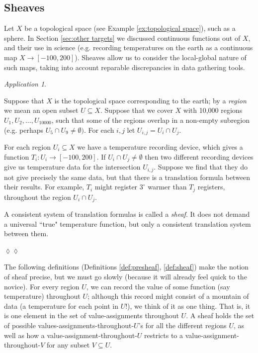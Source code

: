 \documentclass{book}
\def\to{\rightarrow}
\def\taking{\colon}
\def\ss{\subseteq}
\theoremstyle{remark}
\newtheorem{app}[subsubsection]{Application}
\newenvironment{application}{\begin{app}}{\hspace*{\fill}$\lozenge\lozenge$\end{app}}
\theoremstyle{definition}
\begin{document}

\subsection{Sheaves}\label{sec:sheaves}

Let $X$ be a topological space (see Example \ref{ex:topological space}), such as a sphere. In Section \ref{sec:other targets} we discussed continuous functions out of $X$, and their use in science (e.g. recording temperatures on the earth as a continuous map $X\to[-100,200]$). Sheaves allow us to consider the local-global nature of such maps, taking into account reparable discrepancies in data gathering tools. 

\begin{application}\label{app:sheaves of temperature}

Suppose that $X$ is the topological space corresponding to the earth; by a {\em region} we mean an open subset $U\ss X$. Suppose that we cover $X$ with 10,000 regions $U_1,U_2,\ldots,U_{10000}$, such that some of the regions overlap in a non-empty subregion (e.g. perhaps $U_5\cap U_9\neq\emptyset)$. For each $i,j$ let $U_{i,j}=U_i\cap U_j$. 

For each region $U_i\ss X$ we have a temperature recording device, which gives a function $T_i\taking U_i\to[-100,200]$. If $U_i\cap U_j\neq\emptyset$ then two different recording devices give us temperature data for the intersection $U_{i,j}$. Suppose we find that they do not give precisely the same data, but that there is a translation formula between their results. For example, $T_i$ might register $3^\circ$ warmer than $T_j$ registers, throughout the region $U_i\cap U_j$.

A consistent system of translation formulas is called a {\em sheaf}. It does not demand a universal ``true" temperature function, but only a consistent translation system between them. 

\end{application}

The following definitions (Definitions \ref{def:presheaf}, \ref{def:sheaf}) make the notion of sheaf precise, but we must go slowly (because it will already feel quick to the novice). For every region $U$, we can record the value of some function (say temperature) throughout $U$; although this record might consist of a mountain of data (a temperature for each point in $U$!), we think of it as one thing. That is, it is one element in the set of value-assignments throughout $U$. A sheaf holds the set of possible values-assignments-throughout-$U$'s for all the different regions $U$, as well as how a value-assignment-throughout-$U$ restricts to a value-assignment-throughout-$V$ for any subset $V\ss U$.
\end{document}
